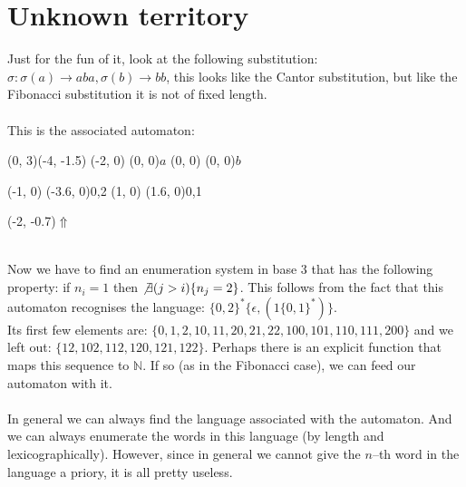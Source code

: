 \documentclass{article}
\begin{document}
\section*{Unknown territory}
Just for the fun of it, look at the following substitution:
$\sigma : \sigma(a) \rightarrow aba, \sigma(b) \rightarrow bb$, this looks
like the Cantor substitution, but like the Fibonacci substitution it is not of
fixed length.\\
\\
This is the associated automaton:\\
\begin{graph}(0, 3)(-4, -1.5)
  (-2, 0) (0, 0){$a$}
  (0, 0)  (0, 0){$b$}

  (-1, 0) \freetext(-3.6, 0){0,2}
   
  (1, 0) \freetext(1.6, 0){0,1}

  \freetext(-2, -0.7){$\Uparrow$}
\end{graph}\\
Now we have to find an enumeration system in base 3 that has the following
property: if $n_i = 1$ then $\not\exists (j > i) \{ n_j = 2\}$. This follows
from the fact that this automaton recognises the language:
$\{0, 2\}^* \{\epsilon, (1\{0, 1\}^*)\}$.\\
Its first few elements are:
$\{0, 1, 2, 10, 11, 20, 21, 22, 100, 101, 110, 111, 200\}$ and we left out:
$\{12, 102, 112, 120, 121, 122\}$. Perhaps there is an explicit function that
maps this sequence to $\mathbb{N}$. If so (as in the Fibonacci case), we can
feed our automaton with it.\\
\\
In general we can always find the language associated with the automaton. And
we can always enumerate the words in this language (by length and
lexicographically). However, since in general we cannot give the $n$--th word
in the language a priory, it is all pretty useless.
\end{document}
